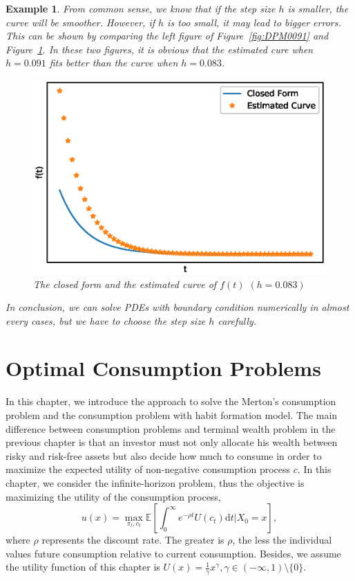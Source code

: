 \documentclass[a4paper]{article}
\newtheorem{exa}{Example}[section]
\theoremstyle{definition}
\numberwithin{equation}{section}
\begin{document}
\begin{exa}
From common sense, we know that if the step size $h$ is smaller, the curve will be smoother. However, if $h$ is too small, it may lead to bigger errors. This can be shown by comparing the left figure of Figure~\ref{fig:DPM0091} and Figure~\ref{fig:DPM0083}. In these two figures, it is obvious that the estimated cure when $h=0.091$ fits better than the curve when $h=0.083$.
\begin{figure}[H]
\centering
\includegraphics[scale=0.6]{DPMh0083.eps}
\caption{The closed form and the estimated curve of $f(t)$ $(h=0.083)$}
\label{fig:DPM0083}
\end{figure}
In conclusion, we can solve PDEs with boundary condition numerically in almost every cases, but we have to choose the step size $h$ carefully.
\end{exa}

\section{Optimal Consumption Problems}\label{ch:consumption_problem}

In this chapter, we introduce the approach to solve the Merton's consumption problem and the consumption problem with habit formation model. The main difference between consumption problems and terminal wealth problem in the previous chapter is that an investor must not only allocate his wealth between risky and risk-free assets but also decide how much to consume in order to maximize the expected utility of non-negative consumption process $c$. In this chapter, we consider the infinite-horizon problem, thus the objective is maximizing the utility of the consumption process,
\begin{equation}\label{infinity-problem}
u(x)=\max_{\pi_t,c_t}\mathbb E[\int^\infty_0e^{-\rho t}U(c_t)\mathrm dt\lvert X_0=x],
\end{equation}
where $\rho$ represents the discount rate. The greater is $\rho$, the less the individual values future consumption relative to current consumption. Besides, we assume the utility function of this chapter is $U(x)=\frac{1}{\gamma}x^\gamma, \gamma\in(-\infty,1)\setminus\{0\}$.
\end{document}
